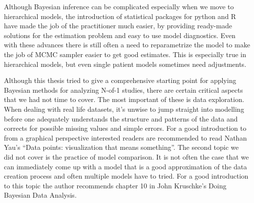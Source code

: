 \documentclass[12pt,a4paper,leqno]{report}
\theoremstyle{plain}
\theoremstyle{definition}
\theoremstyle{remark}
\begin{document}
Although Bayesian inference can be complicated especially when we move to hierarchical
models, the introduction of statistical packages for python and R have made the job of
the practitioner much easier, by providing ready-made solutions for the estimation
problem and easy to use model diagnostics. Even with these advances there is still often
a need to reparametrize the model to make the job of MCMC sampler easier to get good
estimates. This is especially true in hierarchical models, but even single patient
models sometimes need adjustments.

Although this thesis tried to give a comprehensive starting point for applying Bayesian
methods for analyzing N-of-1 studies, there are certain critical aspects that we had not
time to cover. The most important of these is data exploration. When dealing with real
life datasets, it's unwise to jump straight into modelling before one adequately
understands the structure and patterns of the data and corrects for possible missing
values and simple errors. For a good introduction to from a graphical perspective
interested readers are recommended to read Nathan Yau's
``Data points: visualization that means something''\cite{dataexploration}.
The second topic we did not cover is the practice of model comparison. It is not often
the case that we can immediately come up with a model that is a good approximation of
the data creation process and often multiple models have to tried. For a good
introduction to this topic the author recommends chapter 10 in John Kruschke's Doing
Bayesian Data Analysis\cite{kruschke}.

\end{document}
